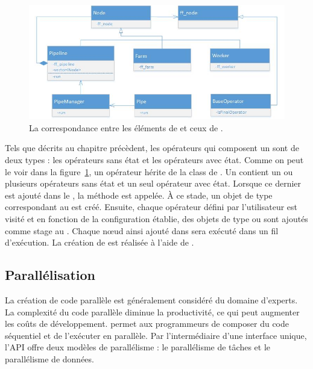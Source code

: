 \begin{figure}[ht]
\centering
     \includegraphics[width=1.0\textwidth]{Figures/MapToFastFlow.jpg}
      \caption{La correspondance entre les \'el\'ements de  et ceux de  .}
       \label{MapToFastFlow.fig}
\end{figure}


Tels que d\'ecrits au chapitre pr\'ec\`edent, les op\'erateurs qui composent un  sont de deux types : les op\'erateurs sans \'etat et les op\'erateurs avec \'etat. Comme on peut le voir dans la figure~\ref{MapToFastFlow.fig}, un op\'erateur h\'erite de la class  de . Un  contient un ou plusieurs op\'erateurs sans \'etat et un seul op\'erateur avec \'etat. Lorsque ce dernier est ajout\'e dans le , la m\'ethode  est appel\'ee. \`A ce stade, un objet de type  correspondant au  est cr\'e\'e. Ensuite, chaque op\'erateur d\'efini par l'utilisateur est visit\'e et en fonction de la configuration \'etablie, des objets de type  ou  sont ajout\'es comme stage au . Chaque nœud ainsi ajout\'e dans  sera ex\'ecut\'e dans un fil d'ex\'ecution.
La cr\'eation de  est r\'ealis\'ee \`a l'aide de .


\subsection{Parall\'elisation}

La cr\'eation de code parall\`ele est g\'en\'eralement consid\'er\'e du domaine d'experts. La complexit\'e du code parall\`ele diminue la productivit\'e, ce qui peut augmenter les co\^uts de d\'eveloppement.  permet aux programmeurs de composer du code s\'equentiel et de l'ex\'ecuter en parall\`ele. Par l'interm\'ediaire d'une interface unique, l'API offre deux mod\`eles de parall\'elisme : le parall\'elisme de t\^aches et le parall\'elisme de donn\'ees.

